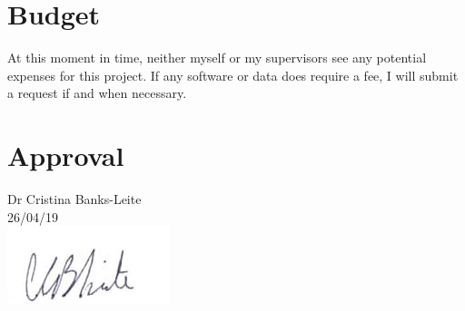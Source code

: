 \documentclass[11pt, titlepage]{article}
\begin{document}
  \section*{Budget}
    At this moment in time, neither myself or my supervisors
    see any potential expenses for this project. If any software
    or data does require a fee, I will submit a request if and when
    necessary.




  
  

  \pagebreak

  \section*{Approval}
    Dr Cristina Banks-Leite \\
    26/04/19 \\
    \includegraphics{assinatura.jpg}
\end{document}

